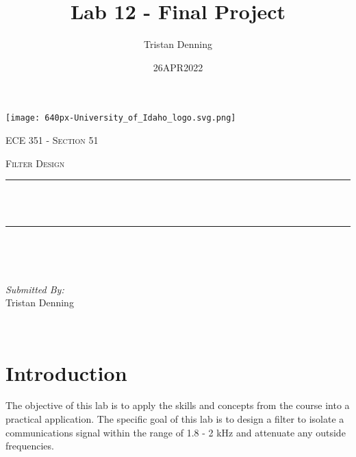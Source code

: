 \documentclass[hidelinks, 12pt]{report}
\title{Lab 12 - Final Project}                                                                                   %
\author{ Tristan Denning}
\date{26APR2022}
\makeatletter
\let\thetitle\@title
\makeatother
\begin{document}
\begin{titlepage}
\centering
\vspace*{0.5 cm}
\texttt{[image: 640px-University\_of\_Idaho\_logo.svg.png]}\\[1.0 cm] %
\begin{center}    \textsc{\Large   ECE 351 - Section 51 }\\[2.0 cm]                                  %
\end{center}%
\textsc{\Large Filter Design}\\[0.5 cm]                %

\rule{\linewidth}{0.2 mm} \\[0.4 cm]
{ \huge \bfseries \thetitle}\\
\rule{\linewidth}{0.2 mm} \\[1.5 cm]
\begin{minipage}{0.4\textwidth}
\begin{flushleft} \large
\end{flushleft}
\end{minipage}~
\begin{minipage}{0.4\textwidth}
\begin{flushright} \large
\emph{Submitted By:} \\
Tristan Denning
\end{flushright}
\end{minipage}\\[2 cm]
\end{titlepage}

\tableofcontents
\pagebreak
\renewcommand{\thesection}{\arabic{section}}
\section{Introduction}                                                                                      %

The objective of this lab is to apply the skills and concepts from the course into a practical application. The specific goal of this lab is to design a filter to isolate a communications signal within the range of 1.8 - 2 kHz and attenuate any outside frequencies.
\end{document}
